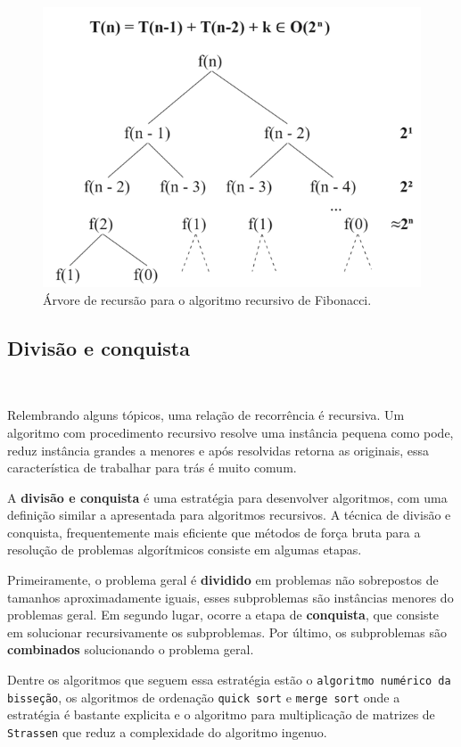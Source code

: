\begin{figure}
  \centering
  \includegraphics[width=0.7\linewidth]{img/arvorerecursaofib.png}
    \caption{Árvore de recursão para o algoritmo recursivo de Fibonacci.}
    \label{arvorerecursaofib}
\end{figure}

\subsection{Divisão e conquista}
\

Relembrando alguns tópicos, uma relação de recorrência é recursiva. Um algoritmo com procedimento recursivo resolve uma instância pequena como pode, reduz instância grandes a menores e após resolvidas retorna as originais, essa característica de trabalhar para trás é muito comum.

A \textbf{divisão e conquista} é uma estratégia para desenvolver algoritmos, com uma definição similar a apresentada para algoritmos recursivos. A técnica de divisão e conquista, frequentemente mais eficiente que métodos de força bruta para a resolução de problemas algorítmicos consiste em algumas etapas.

Primeiramente, o problema geral é \textbf{dividido} em problemas não sobrepostos de tamanhos aproximadamente iguais, esses subproblemas são instâncias menores do problemas geral. Em segundo lugar, ocorre a etapa de \textbf{conquista}, que consiste em solucionar recursivamente os subproblemas. Por último, os subproblemas são \textbf{combinados} solucionando o problema geral.

Dentre os algoritmos que seguem essa estratégia estão o \texttt{algoritmo numérico da bisseção}, os algoritmos de ordenação \texttt{quick sort} e \texttt{merge sort} onde a estratégia é bastante explicita e o algoritmo para multiplicação de matrizes de \texttt{Strassen} que reduz a complexidade do algoritmo ingenuo.

